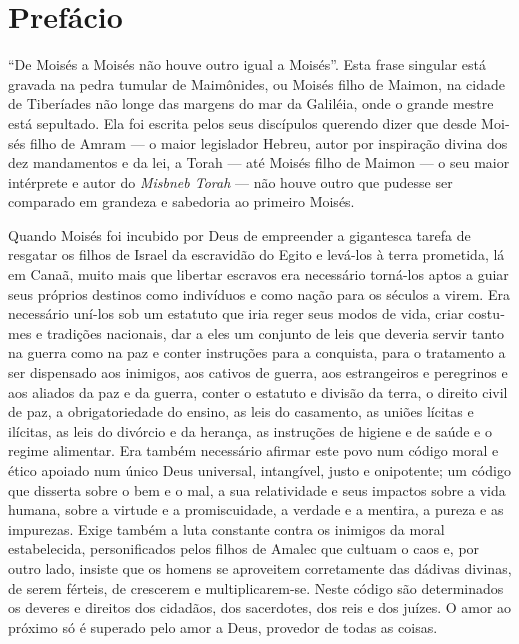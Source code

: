 

\chapter{Prefácio}

``De Moisés a Moisés não houve outro igual a Moisés''. Esta frase
singu­lar está gravada na pedra tumular de Maimônides, ou Moisés filho
de Maimon, na cidade de Tiberíades não longe das margens do mar da
Galiléia, onde o grande mestre está sepultado. Ela foi escrita pelos
seus discípulos querendo dizer que desde Moi­sés filho de Amram --- o
maior legislador Hebreu, autor por inspiração divina dos dez mandamentos
e da lei, a Torah --- até Moisés filho de Maimon --- o seu maior
intérprete e autor do \emph{Misbneb Torah} --- não houve outro que
pudesse ser compara­do em grandeza e sabedoria ao primeiro Moisés.

Quando Moisés foi incubido por Deus de empreender a gigantesca tare­fa
de resgatar os filhos de Israel da escravidão do Egito e levá-los à
terra prometida, lá em Canaã, muito mais que libertar escravos era
necessário torná-los aptos a guiar seus próprios destinos como
indivíduos e como nação para os séculos a virem. Era necessário uní-los
sob um estatuto que iria reger seus modos de vida, criar costu­mes e
tradições nacionais, dar a eles um conjunto de leis que deveria servir
tanto na guerra como na paz e conter instruções para a conquista, para o
tratamento a ser dispensado aos inimigos, aos cativos de guerra, aos
estrangeiros e peregrinos e aos aliados da paz e da guerra, conter o
estatuto e divisão da terra, o direito civil de paz, a obrigatoriedade
do ensino, as leis do casamento, as uniões lícitas e ilícitas, as leis
do divórcio e da herança, as instruções de higiene e de saúde e o regime
alimentar. Era também necessário afirmar este povo num código moral e
ético apoia­do num único Deus universal, intangível, justo e onipotente;
um código que dis­serta sobre o bem e o mal, a sua relatividade e seus
impactos sobre a vida humana, sobre a virtude e a promiscuidade, a
verdade e a mentira, a pureza e as impurezas. Exige também a luta
constante contra os inimigos da moral estabelecida, personifi­cados
pelos filhos de Amalec que cultuam o caos e, por outro lado, insiste que
os homens se aproveitem corretamente das dádivas divinas, de serem
férteis, de cres­cerem e multiplicarem-se. Neste código são determinados
os deveres e direitos dos cidadãos, dos sacerdotes, dos reis e dos
juízes. O amor ao próximo só é superado pelo amor a Deus, provedor de
todas as coisas.

